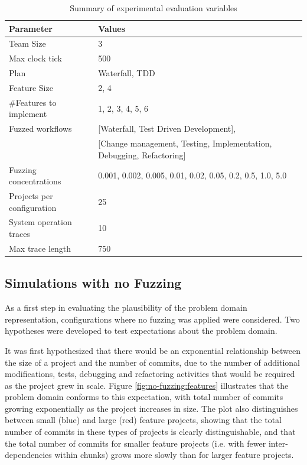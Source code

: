 \documentclass{llncs}
\begin{document}
\begin{table}
  \centering
\begin{tabular}{|l|l|}\hline
Parameter & Values\\ \hline
Team Size & 3\\
Max clock tick & 500\\
Plan & Waterfall, TDD\\
Feature Size & 2, 4\\
\#Features to implement & 1, 2, 3, 4, 5, 6\\
Fuzzed workflows & [Waterfall, Test Driven Development],\\
& [Change management, Testing, Implementation, Debugging, Refactoring]\\
Fuzzing concentrations & 0.001, 0.002, 0.005, 0.01, 0.02, 0.05, 0.2, 0.5, 1.0, 5.0 \\
Projects per configuration & 25 \\
System operation traces & 10\\
Max trace length & 750\\ \hline
\end{tabular}

\caption{Summary of experimental evaluation variables}
\label{tab:variables}
\end{table}


\subsection{Simulations with no Fuzzing}

As a first step in evaluating the plausibility of the problem domain representation, configurations where no fuzzing was
applied were considered.  Two hypotheses were developed to test expectations about the problem domain.

It was first hypothesized that there would be an exponential relationship between the size of a project and the number
of commits, due to the number of additional modifications, tests, debugging and refactoring activities that would be
required as the project grew in scale.  Figure \ref{fig:no-fuzzing:features} illustrates that the problem domain
conforms to this expectation, with total number of commits growing exponentially as the project increases in size.  The
plot also distinguishes between small (blue) and large (red) feature projects, showing that the total number of commits
in these types of projects is clearly distinguishable, and that the total number of commits for smaller feature projects
(i.e. with fewer inter-dependencies within chunks) grows more slowly than for larger feature projects.
\end{document}
